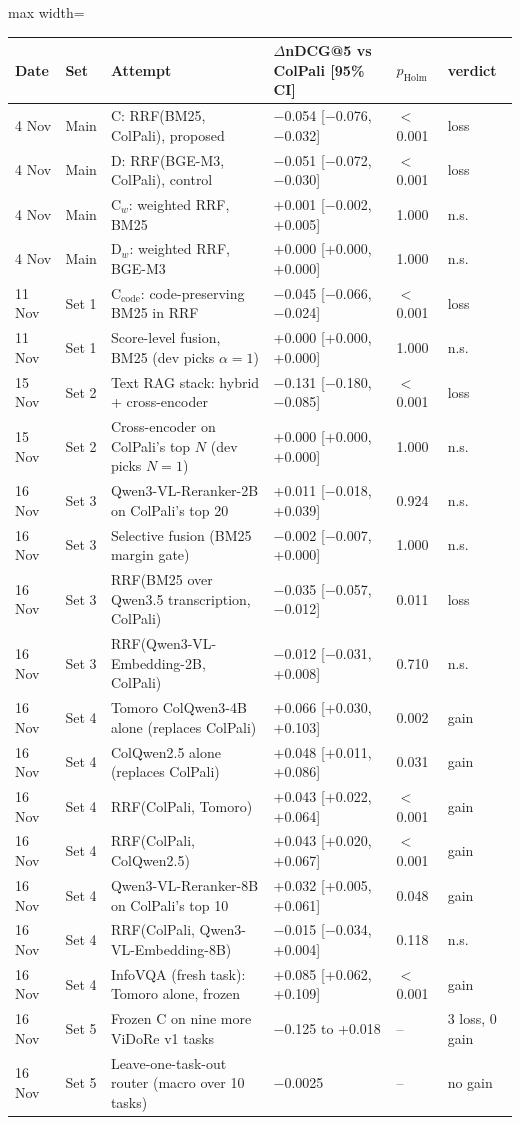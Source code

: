 \begin{adjustbox}{max width=\linewidth}
\begin{tabular}{llp{6.2cm}lll}
\toprule
Date & Set & Attempt & $\Delta$nDCG@5 vs ColPali [95\% CI] & $p_\mathrm{Holm}$ & verdict \\
\midrule
4 Nov & Main & C: RRF(BM25, ColPali), proposed & $-$0.054 [$-$0.076, $-$0.032] & $<$0.001 & loss \\
4 Nov & Main & D: RRF(BGE-M3, ColPali), control & $-$0.051 [$-$0.072, $-$0.030] & $<$0.001 & loss \\
4 Nov & Main & C$_w$: weighted RRF, BM25 & +0.001 [$-$0.002, +0.005] & 1.000 & n.s. \\
4 Nov & Main & D$_w$: weighted RRF, BGE-M3 & +0.000 [+0.000, +0.000] & 1.000 & n.s. \\
11 Nov & Set 1 & C$_\text{code}$: code-preserving BM25 in RRF & $-$0.045 [$-$0.066, $-$0.024] & $<$0.001 & loss \\
11 Nov & Set 1 & Score-level fusion, BM25 (dev picks $\alpha{=}1$) & +0.000 [+0.000, +0.000] & 1.000 & n.s. \\
15 Nov & Set 2 & Text RAG stack: hybrid + cross-encoder & $-$0.131 [$-$0.180, $-$0.085] & $<$0.001 & loss \\
15 Nov & Set 2 & Cross-encoder on ColPali's top $N$ (dev picks $N{=}1$) & +0.000 [+0.000, +0.000] & 1.000 & n.s. \\
16 Nov & Set 3 & Qwen3-VL-Reranker-2B on ColPali's top 20 & +0.011 [$-$0.018, +0.039] & 0.924 & n.s. \\
16 Nov & Set 3 & Selective fusion (BM25 margin gate) & $-$0.002 [$-$0.007, +0.000] & 1.000 & n.s. \\
16 Nov & Set 3 & RRF(BM25 over Qwen3.5 transcription, ColPali) & $-$0.035 [$-$0.057, $-$0.012] & 0.011 & loss \\
16 Nov & Set 3 & RRF(Qwen3-VL-Embedding-2B, ColPali) & $-$0.012 [$-$0.031, +0.008] & 0.710 & n.s. \\
16 Nov & Set 4 & Tomoro ColQwen3-4B alone (replaces ColPali) & +0.066 [+0.030, +0.103] & 0.002 & gain \\
16 Nov & Set 4 & ColQwen2.5 alone (replaces ColPali) & +0.048 [+0.011, +0.086] & 0.031 & gain \\
16 Nov & Set 4 & RRF(ColPali, Tomoro) & +0.043 [+0.022, +0.064] & $<$0.001 & gain \\
16 Nov & Set 4 & RRF(ColPali, ColQwen2.5) & +0.043 [+0.020, +0.067] & $<$0.001 & gain \\
16 Nov & Set 4 & Qwen3-VL-Reranker-8B on ColPali's top 10 & +0.032 [+0.005, +0.061] & 0.048 & gain \\
16 Nov & Set 4 & RRF(ColPali, Qwen3-VL-Embedding-8B) & $-$0.015 [$-$0.034, +0.004] & 0.118 & n.s. \\
\midrule 16 Nov & Set 4 & InfoVQA (fresh task): Tomoro alone, frozen & +0.085 [+0.062, +0.109] & $<$0.001 & gain \\
16 Nov & Set 5 & Frozen C on nine more ViDoRe v1 tasks & $-$0.125 to +0.018 & -- & 3 loss, 0 gain \\
16 Nov & Set 5 & Leave-one-task-out router (macro over 10 tasks) & $-$0.0025 & -- & no gain \\
\bottomrule
\end{tabular}
\end{adjustbox}
